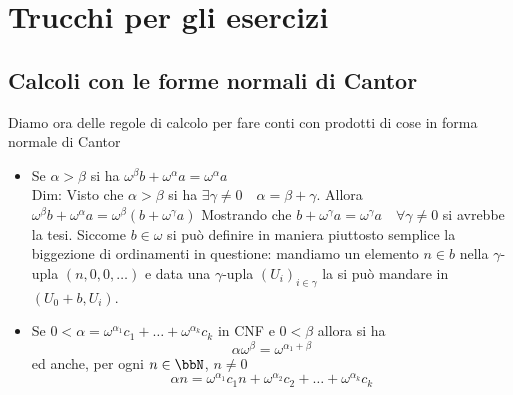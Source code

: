 \documentclass[a4paper,NoNotes,GeneralMath]{stdmdoc}
\begin{document}
	\section*{Trucchi per gli esercizi}
	\subsection*{Calcoli con le forme normali di Cantor}
	Diamo ora delle regole di calcolo per fare conti con prodotti di cose in forma normale di Cantor
	\begin{itemize}
		\item Se $\alpha > \beta$ si ha $\omega^\beta b + \omega^\alpha a = \omega^\alpha a$ \\
			Dim: Visto che $\alpha > \beta$ si ha $\exists \gamma \neq 0 \quad \alpha = \beta + \gamma$. Allora $\omega^\beta b + \omega^\alpha a = \omega^\beta (b + \omega^\gamma a)$ Mostrando che $b + \omega^\gamma a = \omega^\gamma a \quad \forall \gamma \neq 0$ si avrebbe la tesi. Siccome $b \in \omega$ si può definire in maniera piuttosto semplice la biggezione di ordinamenti in questione: mandiamo un elemento $n \in b$ nella $\gamma$-upla $(n, 0, 0, \ldots)$ e data una $\gamma$-upla $(U_i)_{i \in \gamma}$ la si può mandare in $(U_0 + b, U_i)$.
		\item Se $0 < \alpha = \omega^{\alpha_1} c_1 + \ldots + \omega^{\alpha_k} c_k$ in CNF e $0 < \beta$ allora si ha
			$$ \alpha \omega^\beta = \omega^{\alpha_1 + \beta} $$ ed anche, per ogni $n \in \bbN$, $n \neq 0$
			$$ \alpha n = \omega^{\alpha_1} c_1 n + \omega^{\alpha_2} c_2 + \ldots + \omega^{\alpha_k} c_k $$
	\end{itemize}
\end{document}
